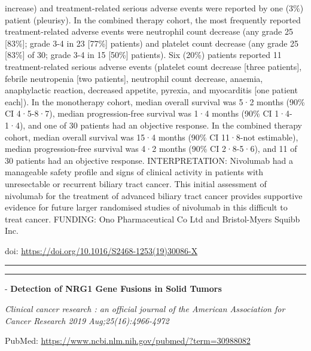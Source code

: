 \documentclass[]{article}
\begin{document}
increase) and treatment-related serious adverse events were reported by
one (3\%) patient (pleurisy). In the combined therapy cohort, the most
frequently reported treatment-related adverse events were neutrophil
count decrease (any grade 25 {[}83\%{]}; grade 3-4 in 23 {[}77\%{]}
patients) and platelet count decrease (any grade 25 {[}83\%{]} of 30;
grade 3-4 in 15 {[}50\%{]} patients). Six (20\%) patients reported 11
treatment-related serious adverse events (platelet count decrease
{[}three patients{]}, febrile neutropenia {[}two patients{]}, neutrophil
count decrease, anaemia, anaphylactic reaction, decreased appetite,
pyrexia, and myocarditis {[}one patient each{]}). In the monotherapy
cohort, median overall survival was 5·2 months (90\% CI 4·5-8·7), median
progression-free survival was 1·4 months (90\% CI 1·4-1·4), and one of
30 patients had an objective response. In the combined therapy cohort,
median overall survival was 15·4 months (90\% CI 11·8-not estimable),
median progression-free survival was 4·2 months (90\% CI 2·8-5·6), and
11 of 30 patients had an objective response. INTERPRETATION: Nivolumab
had a manageable safety profile and signs of clinical activity in
patients with unresectable or recurrent biliary tract cancer. This
initial assessment of nivolumab for the treatment of advanced biliary
tract cancer provides supportive evidence for future larger randomised
studies of nivolumab in this difficult to treat cancer. FUNDING: Ono
Pharmaceutical Co Ltd and Bristol-Myers Squibb Inc.

doi: \url{https://doi.org/10.1016/S2468-1253(19)30086-X}

{}

{}

\begin{center}\rule{0.5\linewidth}{\linethickness}\end{center}

\begin{center}\rule{0.5\linewidth}{\linethickness}\end{center}

 - \textbf{Detection of NRG1 Gene Fusions in Solid Tumors}

\emph{Clinical cancer research : an official journal of the American
Association for Cancer Research 2019 Aug;25(16):4966-4972}

PubMed: \url{https://www.ncbi.nlm.nih.gov/pubmed/?term=30988082}
\end{document}
